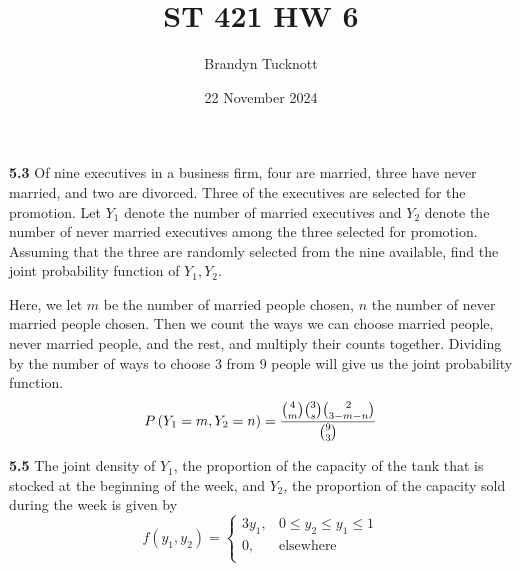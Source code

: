 \documentclass{exam}
\title{ST 421 HW 6}
\author{Brandyn Tucknott}
\date{22 November 2024}
\begin{document}
\maketitle

\begin{questions}
    \textbf{5.3 }
Of nine executives in a business firm, four are married, three have never married, and two are divorced. Three of the executives are selected for the promotion. Let $Y_1$ denote the number of married executives and $Y_2$ denote the number of never married executives among the three selected for promotion. Assuming that the three are randomly selected from the nine available, find the joint probability function of $Y_1, Y_2$.

\sol
Here, we let $m$ be the number of married people chosen, $n$ the number of never married people chosen. Then we count the ways we can choose married people, never married people, and the rest, and multiply their counts together. Dividing by the number of ways to choose 3 from 9 people will give us the joint probability function.
$$P\left( Y_1 = m, Y_2 = n \right) = \frac{\binom{4}{m}\binom{3}{s}\binom{2}{3 - m - n}}{\binom{9}{3}}$$

\newpage
\textbf{5.5 }
The joint density of $Y_1$, the proportion of the capacity of the tank that is stocked at the beginning of the week, and $Y_2$, the proportion of the capacity sold during the week is given by
$$f(y_1, y_2) =
\begin{cases}
    3y_1, & 0 \leq y_2 \leq y_1 \leq 1 \\
    0, & \text{elsewhere} \\
\end{cases}$$



\end{questions}
\end{document}
